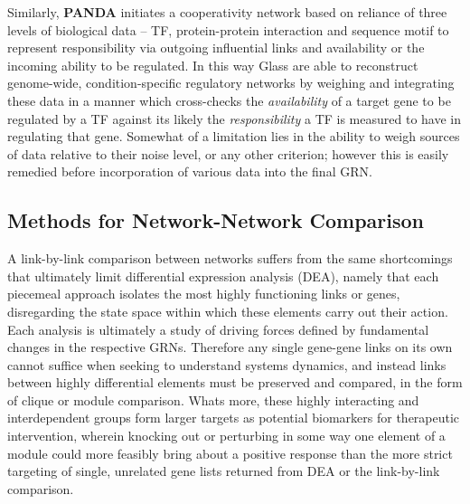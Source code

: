 Similarly, \textbf{PANDA} \cite{glass2013passing} initiates a cooperativity network based on reliance of three levels of biological data -- TF, protein-protein interaction and sequence motif to represent responsibility via outgoing influential links and availability or the incoming ability to be regulated. In this way Glass \etal are able to reconstruct genome-wide, condition-specific regulatory networks by weighing and integrating these data in a manner which cross-checks the \emph{availability} of a target gene to be regulated by a TF against its likely the \emph{responsibility} a TF is measured to have in regulating that gene. Somewhat of a limitation lies in the ability to weigh sources of data relative to their noise level, or any other criterion; however this is easily remedied before incorporation of various data into the final GRN.

\subsection{Methods for Network-Network Comparison}
\label{sec:net_com}
A link-by-link comparison between networks suffers from the same shortcomings that ultimately limit differential expression analysis (DEA), namely that each piecemeal approach isolates the most highly functioning links or genes, disregarding the state space within which these elements carry out their action. Each analysis is ultimately a study of driving forces defined by fundamental changes in the respective GRNs. Therefore any single gene-gene links on its own cannot suffice when seeking to understand systems dynamics, and instead links between highly differential elements must be preserved and compared, in the form of clique or module comparison. Whats more, these highly interacting and interdependent groups form larger targets as potential biomarkers for therapeutic intervention, wherein knocking out or perturbing in some way one element of a module could more feasibly bring about a positive response than the more strict targeting of single, unrelated gene lists returned from DEA or the link-by-link comparison.

